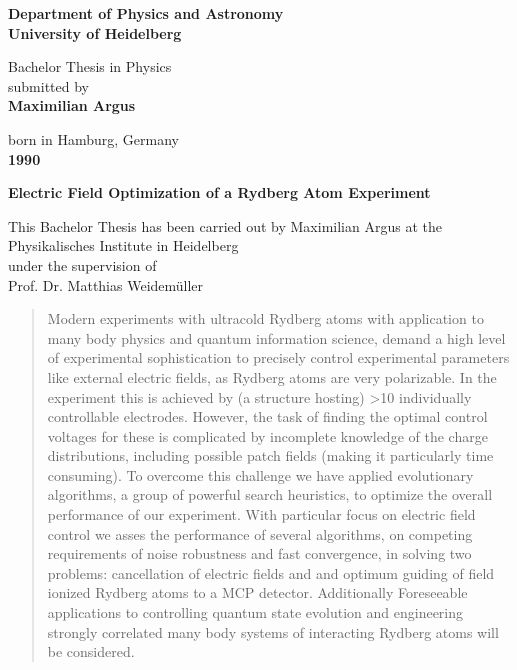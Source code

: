\documentclass[a4paper,titlepage]{report}
\begin{document}
\begin{titlepage}

\begin{center}
 
\Large\textbf{Department of Physics and Astronomy\\
University of Heidelberg}

\vspace{18cm}

\normalsize
Bachelor Thesis in Physics\\
submitted by\\
\vspace{0.5cm}
\Large\textbf{Maximilian Argus}\\
\normalsize
\vspace{0.5cm}

born in Hamburg, Germany\\
\vspace{0.5cm}
\Large\textbf{1990}
\normalsize

\newpage




\Large\textbf{Electric Field Optimization of a Rydberg Atom Experiment}

\vspace{18cm}

\normalsize
This Bachelor Thesis has been carried out by Maximilian Argus at the\\
Physikalisches Institute in Heidelberg\\
under the supervision of\\
Prof. Dr. Matthias Weidem\"uller

\vfill
\end{center}

\end{titlepage}


\begin{abstract}
Modern experiments with ultracold Rydberg atoms with application to
many body physics and quantum information science, demand a high
level of experimental sophistication to precisely control experimental
parameters like external electric fields, as Rydberg atoms are very
 polarizable. In the experiment this is achieved by (a structure hosting)
>10 individually controllable electrodes. However, the task of finding
the optimal control voltages for these is complicated by incomplete
knowledge of the charge distributions, including possible patch fields
(making it particularly time consuming). To overcome this challenge
we have applied evolutionary algorithms, a group of powerful search
heuristics, to optimize the overall performance of our experiment. With
particular focus on electric field control we asses the performance of
several algorithms, on competing requirements of noise robustness and
fast convergence, in solving two problems: cancellation of electric fields
and and optimum guiding of field ionized Rydberg atoms to a MCP
detector. Additionally Foreseeable applications to controlling quantum
state evolution and engineering strongly correlated many body systems
of interacting Rydberg atoms will be considered.
\end{abstract}
\end{document}
